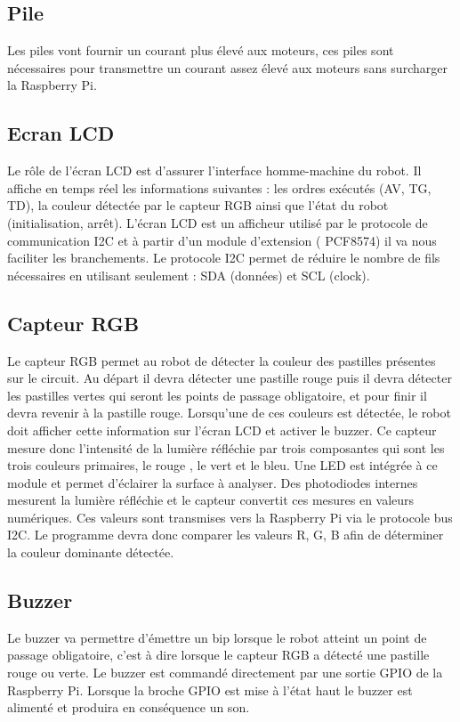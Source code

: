 \subsection{Pile}
Les piles vont fournir un courant plus élevé aux moteurs, ces piles sont nécessaires pour transmettre un courant assez élevé aux moteurs sans surcharger la Raspberry Pi.

\subsection{Ecran LCD} 
Le rôle de l'écran LCD est d'assurer l'interface homme-machine du robot. Il affiche en temps réel les informations suivantes : les ordres exécutés (AV, TG, TD), la couleur détectée par le capteur RGB ainsi que l'état du robot (initialisation, arrêt).
L'écran LCD est un afficheur utilisé par le protocole de communication I2C et à partir d'un module d'extension ( PCF8574) il va nous faciliter les branchements.
Le protocole I2C permet de réduire le nombre de fils nécessaires en utilisant seulement : SDA (données) et SCL (clock).

\subsection{Capteur RGB}
Le capteur RGB permet au robot de détecter la couleur des pastilles présentes sur le circuit. Au départ il devra détecter une pastille rouge puis il devra détecter les pastilles vertes qui seront les points de passage obligatoire, et pour finir il devra revenir à la pastille rouge. Lorsqu'une de ces couleurs est détectée, le robot doit afficher cette information sur l'écran LCD et activer le buzzer.
Ce capteur mesure donc l'intensité de la lumière réfléchie par trois composantes qui sont les trois couleurs primaires, le rouge , le vert et le bleu. Une LED est intégrée à ce module et permet d'éclairer la surface à analyser. Des photodiodes internes mesurent la lumière réfléchie et le capteur convertit ces mesures en valeurs numériques. Ces valeurs sont transmises vers la Raspberry Pi via le protocole bus I2C. 
Le programme devra donc comparer les valeurs R, G, B afin de déterminer la couleur dominante détectée.

\subsection{Buzzer}
Le buzzer va permettre d'émettre un bip lorsque le robot atteint un point de passage obligatoire, c'est à dire lorsque le capteur RGB a détecté une pastille rouge ou verte.
Le buzzer est commandé directement par une sortie GPIO de la Raspberry Pi. Lorsque la broche GPIO est mise à l'état haut le buzzer est alimenté et produira en conséquence un son. 

